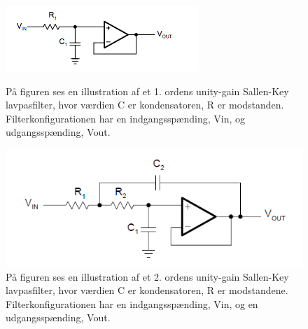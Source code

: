 \begin{figure}[H]
	\centering
	\begin{minipage}[b]{0.45\textwidth}
		\includegraphics[width=\textwidth]{figures/cProblemloesning/Lavpasfilter1_teoretisk.PNG}
		\caption{På figuren ses en illustration af et 1. ordens unity-gain Sallen-Key lavpasfilter, hvor værdien C er kondensatoren, R er modstanden. Filterkonfigurationen har en indgangsspænding, Vin, og udgangsspænding, Vout. \cite{Carter2013}}
		\label{fig:SallenKey1}
	\end{minipage}
	\hfill
	\begin{minipage}[b]{0.45\textwidth}
		\includegraphics[width=\textwidth]{figures/cProblemloesning/Sallenlavpas.PNG}
		\caption{På figuren ses en illustration af et 2. ordens unity-gain Sallen-Key lavpasfilter, hvor værdien C er kondensatoren, R er modstandene. Filterkonfigurationen har en indgangsspænding, Vin, og en udgangsspænding, Vout. \cite{Carter2013}}
		\label{fig:SallenKey2}
	\end{minipage}
\end{figure}

